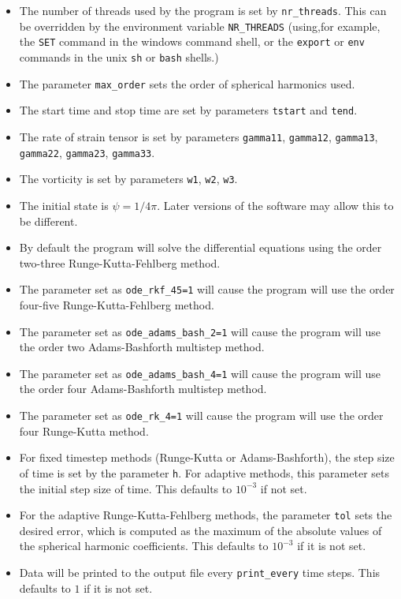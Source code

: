 \documentclass{amsart}
\begin{document}
\begin{itemize}
\item The number of threads used by the program is set by {\tt nr\_threads}.  This can be overridden by the environment variable {\tt NR\_THREADS} (using,for example, the {\tt SET} command in the windows command shell, or the {\tt export} or {\tt env} commands in the unix {\tt sh} or {\tt bash} shells.)
\item The parameter {\tt max\_order} sets the order of spherical harmonics used.
\item The start time and stop time are set by parameters {\tt tstart} and {\tt tend}.
\item The rate of strain tensor is set by parameters {\tt gamma11}, {\tt gamma12}, {\tt gamma13}, {\tt gamma22}, {\tt gamma23}, {\tt gamma33}.
\item The vorticity is set by parameters {\tt w1}, {\tt w2}, {\tt w3}.
\item The initial state is $\psi = 1/4\pi$.  Later versions of the software may allow this to be different.
\item By default the program will solve the differential equations using the order two-three Runge-Kutta-Fehlberg method.
\item The parameter set as {\tt ode\_rkf\_45=1} will cause the program will use the order four-five Runge-Kutta-Fehlberg method.
\item The parameter set as {\tt ode\_adams\_bash\_2=1} will cause the program will use the order two Adams-Bashforth multistep method.
\item The parameter set as {\tt ode\_adams\_bash\_4=1} will cause the program will use the order four Adams-Bashforth multistep method.
\item The parameter set as {\tt ode\_rk\_4=1} will cause the program will use the order four Runge-Kutta method.
\item For fixed timestep methods (Runge-Kutta or Adams-Bashforth), the step size of time is set by the parameter {\tt h}.  For adaptive methods, this parameter sets the initial step size of time.  This defaults to $10^{-3}$ if not set.
\item For the adaptive Runge-Kutta-Fehlberg methods, the parameter {\tt tol} sets the desired error, which is computed as the maximum of the absolute values of the spherical harmonic coefficients.  This defaults to $10^{-3}$ if it is not set.
\item Data will be printed to the output file every {\tt print\_every} time steps.  This defaults to $1$ if it is not set.
\end{itemize}
\end{document}
